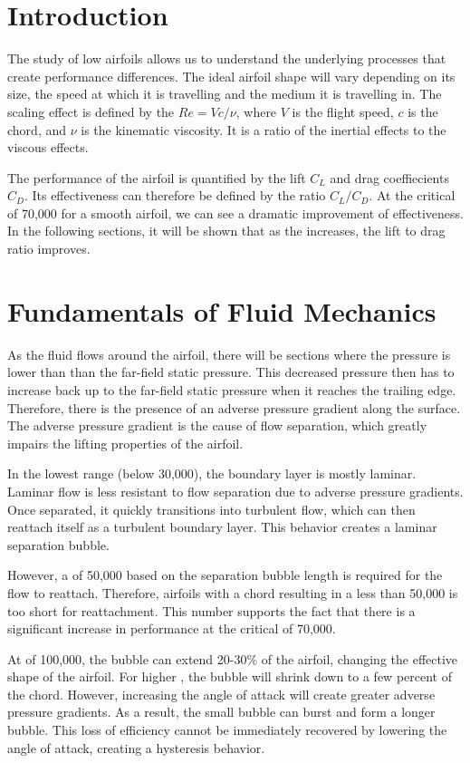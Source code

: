 \documentclass[letterpaper,12pt,]{article}
\begin{document}
\section{Introduction}

The study of low \rn airfoils allows us to understand the underlying processes that create performance differences. The ideal airfoil shape will vary depending on its size, the speed at which it is travelling and the medium it is travelling in. The scaling effect is defined by the \rn $Re = Vc/\nu$, where $V$ is the flight speed, $c$ is the chord, and $\nu$ is the kinematic viscosity. It is a ratio of the inertial effects to the viscous effects.

The performance of the airfoil is quantified by the lift $C_L$ and drag coeffiecients $C_D$. Its effectiveness can therefore be defined by the ratio $C_L/C_D$. At the critical \rn of 70,000 for a smooth airfoil, we can see a dramatic improvement of effectiveness. In the following sections, it will be shown that as the \rn increases, the lift to drag ratio improves. 
\section{Fundamentals of Fluid Mechanics}

As the fluid flows around the airfoil, there will be sections where the pressure is lower than than the far-field static pressure. This decreased pressure then has to increase back up to the far-field static pressure when it reaches the trailing edge. Therefore, there is the presence of an adverse pressure gradient along the surface. The adverse pressure gradient is the cause of flow separation, which greatly impairs the lifting properties of the airfoil.

In the lowest \rn range (below 30,000), the boundary layer is mostly laminar. Laminar flow is less resistant to flow separation due to adverse pressure gradients. Once separated, it quickly transitions into turbulent flow, which can then reattach itself as a turbulent boundary layer. This behavior creates a laminar separation bubble.

However, a \rn of 50,000 based on the separation bubble length is required for the flow to reattach. Therefore, airfoils with a chord resulting in a \rn less than 50,000 is too short for reattachment. This number supports the fact that there is a significant increase in performance at the critical \rn of 70,000.

At \rn of 100,000, the bubble can extend 20-30\% of the airfoil, changing the effective shape of the airfoil. For higher \rn, the bubble will shrink down to a few percent of the chord. However, increasing the angle of attack will create greater adverse pressure gradients. As a result, the small bubble can burst and form a longer bubble. This loss of efficiency cannot be immediately recovered by lowering the angle of attack, creating a hysteresis behavior.
\end{document}
